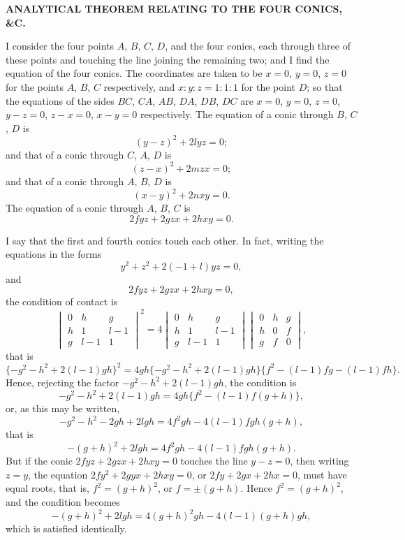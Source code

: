 \documentclass[11pt,a4paper]{article}
\begin{document}
\begin{center}
\textbf{ANALYTICAL THEOREM RELATING TO THE FOUR CONICS, \&C.}
\end{center}


\bigskip

\noindent I consider the four points $A$, $B$, $C$, $D$, and the four conics, each through three of these points and touching the line joining the remaining two; and I find the equation of the four conics. The coordinates are taken to be $x=0$, $y=0$, $z=0$ for the points $A$, $B$, $C$ respectively, and $x:y:z=1:1:1$ for the point $D$; so that the equations of the sides $BC$, $CA$, $AB$, $DA$, $DB$, $DC$ are $x=0$, $y=0$, $z=0$, $y-z=0$, $z-x=0$, $x-y=0$ respectively. The equation of a conic through $B$, $C$, $D$ is
\[
(y-z)^2 + 2lyz = 0;
\]
and that of a conic through $C$, $A$, $D$ is
\[
(z-x)^2 + 2mzx = 0;
\]
and that of a conic through $A$, $B$, $D$ is
\[
(x-y)^2 + 2nxy = 0.
\]
The equation of a conic through $A$, $B$, $C$ is
\[
2fyz + 2gzx + 2hxy = 0.
\]

I say that the first and fourth conics touch each other. In fact, writing the equations in the forms
\[
y^2 + z^2 + 2(-1+l)yz = 0,
\]
and
\[
2fyz + 2gzx + 2hxy = 0,
\]
the condition of contact is
\[
\begin{vmatrix}
0 & h & g \\
h & 1 & l-1 \\
g & l-1 & 1
\end{vmatrix}^2
= 4
\begin{vmatrix}
0 & h & g \\
h & 1 & l-1 \\
g & l-1 & 1
\end{vmatrix}
\begin{vmatrix}
0 & h & g \\
h & 0 & f \\
g & f & 0
\end{vmatrix},
\]
that is
\[
\{-g^2 - h^2 + 2(l-1)gh\}^2 = 4gh\{-g^2 - h^2 + 2(l-1)gh\}\{f^2 - (l-1)fg - (l-1)fh\}.
\]
Hence, rejecting the factor $-g^2 - h^2 + 2(l-1)gh$, the condition is
\[
-g^2 - h^2 + 2(l-1)gh = 4gh\{f^2 - (l-1)f(g+h)\},
\]
or, as this may be written,
\[
-g^2 - h^2 - 2gh + 2lgh = 4f^2 gh - 4(l-1)fgh(g+h),
\]
that is
\[
-(g+h)^2 + 2lgh = 4f^2 gh - 4(l-1)fgh(g+h).
\]
But if the conic $2fyz + 2gzx + 2hxy = 0$ touches the line $y-z=0$, then writing $z=y$, the equation $2fy^2 + 2gyx + 2hxy = 0$, or $2fy + 2g x + 2hx = 0$, must have equal roots, that is, $f^2 = (g+h)^2$, or $f = \pm(g+h)$. Hence $f^2 = (g+h)^2$, and the condition becomes
\[
-(g+h)^2 + 2lgh = 4(g+h)^2 gh - 4(l-1)(g+h)gh,
\]
which is satisfied identically.
\end{document}
